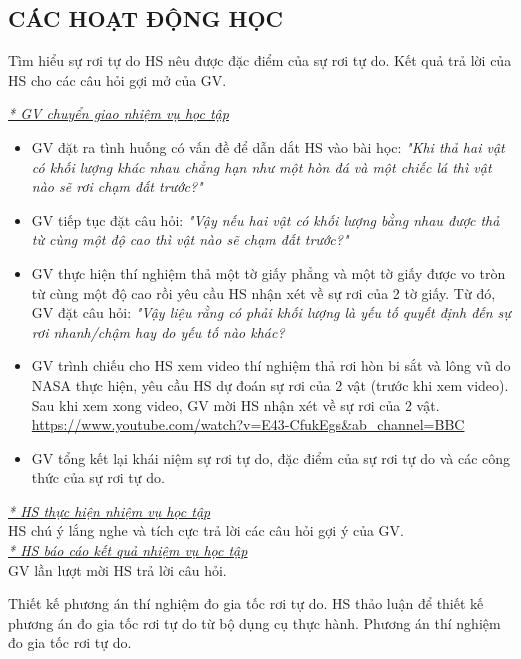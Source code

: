 \subsection{CÁC HOẠT ĐỘNG HỌC}
\hoatdong
{Tìm hiểu sự rơi tự do
}
{HS nêu được đặc điểm của sự rơi tự do.
}
{Kết quả trả lời của HS cho các câu hỏi gợi mở của GV.
}
{\textit{\underline{* GV chuyển giao nhiệm vụ học tập}}
	\begin{itemize}[label=-]
		\item GV đặt ra tình huống có vấn đề để dẫn dắt HS vào bài học: \textit{"Khi thả hai vật có khối lượng khác nhau chẳng hạn như một hòn đá và một chiếc lá thì vật nào sẽ rơi chạm đất trước?"}
		\item GV tiếp tục đặt câu hỏi: \textit{"Vậy nếu hai vật có khối lượng bằng nhau được thả từ cùng một độ cao thì vật nào sẽ chạm đất trước?"}
		\item GV thực hiện thí nghiệm thả một tờ giấy phẳng và một tờ giấy được vo tròn từ cùng một độ cao rồi yêu cầu HS nhận xét về sự rơi của 2 tờ giấy. Từ đó, GV đặt câu hỏi: \textit{"Vậy liệu rằng có phải khối lượng là yếu tố quyết định đến sự rơi nhanh/chậm hay do yếu tố nào khác?}
		\item GV trình chiếu cho HS xem video thí nghiệm thả rơi hòn bi sắt và lông vũ do NASA thực hiện, yêu cầu HS dự đoán sự rơi của 2 vật (trước khi xem video). Sau khi xem xong video, GV mời HS nhận xét về sự rơi của 2 vật.\\
		\url{https://www.youtube.com/watch?v=E43-CfukEgs&ab_channel=BBC}
		\item GV tổng kết lại khái niệm sự rơi tự do, đặc điểm của sự rơi tự do và các công thức của sự rơi tự do.
	\end{itemize}
		\textit{\underline{* HS thực hiện nhiệm vụ học tập}}\\
		HS chú ý lắng nghe và tích cực trả lời các câu hỏi gợi ý của GV.\\
		\textit{\underline{* HS báo cáo kết quả nhiệm vụ học tập}}\\
		GV lần lượt mời HS trả lời câu hỏi.
}
\hoatdong
{ Thiết kế phương án thí nghiệm đo gia tốc rơi tự do.
}
{HS thảo luận để thiết kế phương án đo gia tốc rơi tự do từ bộ dụng cụ thực hành.
}
{Phương án thí nghiệm đo gia tốc rơi tự do.
}
